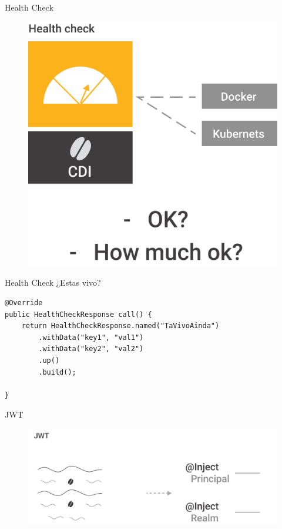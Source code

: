 \documentclass[aspectratio=169]{beamer}
\begin{document}
\begin{frame}{Health Check}
\begin{figure}
	\centering
	\includegraphics[width=0.75\linewidth]{Images/healthcheck}
\end{figure}
\end{frame}

\begin{frame}[fragile]{Health Check}
¿Estas vivo?
\begin{lstlisting}
@Override
public HealthCheckResponse call() {
	return HealthCheckResponse.named("TaVivoAinda")
		.withData("key1", "val1")
		.withData("key2", "val2")
		.up()
		.build();

}
\end{lstlisting}

\end{frame}


\begin{frame}{JWT}
\begin{figure}
	\centering
	\includegraphics[width=0.9\linewidth]{Images/jwt}
\end{figure}
\end{frame}
\end{document}
